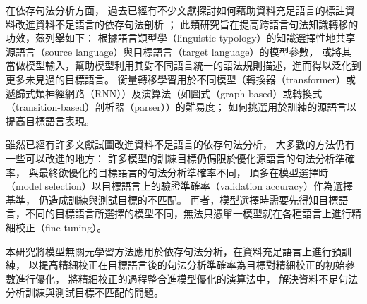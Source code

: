 在依存句法分析方面，
過去已經有不少文獻探討如何藉助資料充足語言的標註資料改進資料不足語言的依存句法剖析
\cite{zhang-barzilay-2015-hierarchical,agic-etal-2016-multilingual,rasooli-collins-2017-cross}；
此類研究旨在提高跨語言句法知識轉移的功效，茲列舉如下：
根據語言類型學（linguistic typology）的知識\cite{wals}選擇性地共享源語言（source language）與目標語言（target language）的模型參數\cite{naseem-etal-2012-selective}，
或將其當做模型輸入，幫助模型利用其對不同語言統一的語法規則描述，進而得以泛化到更多未見過的目標語言\cite{tackstrom-etal-2013-target,zhang-barzilay-2015-hierarchical,aufrant-etal-2016-zero,littell-etal-2017-uriel}。
衡量轉移學習用於不同模型（轉換器（transformer）或遞歸式類神經網路（RNN））及演算法（如圖式（graph-based）或轉換式（transition-based）剖析器（parser））的難易度\cite{ahmad-etal-2019-difficulties}；
如何挑選用於訓練的源語言以提高目標語言表現\cite{lin-etal-2019-choosing}。

雖然已經有許多文獻試圖改進資料不足語言的依存句法分析，
大多數的方法仍有一些可以改進的地方：
許多模型的訓練目標仍侷限於優化源語言的句法分析準確率，
與最終欲優化的目標語言的句法分析準確率不同，
頂多在模型選擇時（model selection）以目標語言上的驗證準確率（validation accuracy）作為選擇基準，
仍造成訓練與測試目標的不匹配。
再者，模型選擇時需要先得知目標語言，不同的目標語言所選擇的模型不同，無法只憑單一模型就在各種語言上進行精細校正（fine-tuning）。

本研究將模型無關元學習方法應用於依存句法分析，在資料充足語言上進行預訓練，
以提高精細校正在目標語言後的句法分析準確率為目標對精細校正的初始參數進行優化，
將精細校正的過程整合進模型優化的演算法中，
解決資料不足句法分析訓練與測試目標不匹配的問題。

\iffalse
近年來，多語言的語言模型（Multilingual Language Models）的出現進一步提升了跨語言轉移學習的表現\cite{devlin-etal-2019-bert,Conneau2019UnsupervisedCR}。
另人驚訝的是，這些模型使用的語料只限於單語言（非平行），所有語言並共享單一模型，研究卻發現它們有自動對齊不同語言句法資訊的能力\cite{chi2020finding}。

孔氏\cite{kondratyuk-straka-2019-75}調適多語言BERT模型\cite{devlin-etal-2019-bert}（multilingual BERT, 下稱$\mathrm{mBERT}$）在UD句法樹庫2.3版的75種語言上，建構了一個多語言依存句法剖析器，
並獲得了高水準的表現；但孔氏也發現多語言依存句法剖析器對資料不足語言的幫助大於對資料充足語言的幫助（相對於單語言的依存句法剖析器而言），
與近年來文獻對多語言單一模型的觀察「多語言的詛咒」\cite{conneau-etal-2020-unsupervised}（the curse of multilinguality）相符。
烏氏\cite{ustun2020udapter}提出使用語言類型學資訊產生$\mathrm{mBERT}$的適應器\cite{rebuffi2018efficient,houlsby2019parameter}參數以解決「多語言詛咒」，結果成功適度減輕模型在資料充足語言上的表現退步的情形。
\fi

